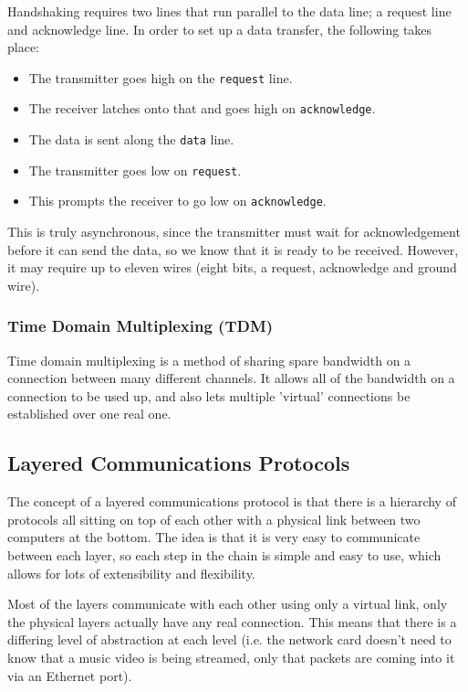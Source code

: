 Handshaking requires two lines that run parallel to the data line; a request
line and acknowledge line. In order to set up a data transfer, the following
takes place:

\begin{itemize}
	\item The transmitter goes high on the {\tt request} line.
	\item The receiver latches onto that and goes high on {\tt acknowledge}.
	\item The data is sent along the {\tt data} line.
	\item The transmitter goes low on {\tt request}.
	\item This prompts the receiver to go low on {\tt acknowledge}.
\end{itemize}

This is truly asynchronous, since the transmitter must wait for acknowledgement
before it can send the data, so we know that it is ready to be received.
However, it may require up to eleven wires (eight bits, a request, acknowledge
and ground wire).

\subsubsection{Time Domain Multiplexing (TDM)}

Time domain multiplexing is a method of sharing spare bandwidth on a connection
between many different channels. It allows all of the bandwidth on a connection
to be used up, and also lets multiple 'virtual' connections be established over
one real one.

\subsection{Layered Communications Protocols}

The concept of a layered communications protocol is that there is a hierarchy of
protocols all sitting on top of each other with a physical link between two
computers at the bottom. The idea is that it is very easy to communicate between
each layer, so each step in the chain is simple and easy to use, which allows
for lots of extensibility and flexibility.

Most of the layers communicate with each other using only a virtual link, only
the physical layers actually have any real connection. This means that there is
a differing level of abstraction at each level (i.e. the network card doesn't
need to know that a music video is being streamed, only that packets are coming
into it via an Ethernet port).
